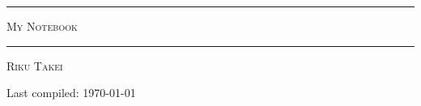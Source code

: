 \begin{titlepage}

\centering

\rule[2.0mm]{0.5\textwidth}{0.5mm}

\begin{doublespace}
    {\Huge \scshape My Notebook}
\end{doublespace}

\rule[2.0mm]{0.5\textwidth}{0.5mm}

\vfill

\vspace{2.0mm}
{\Large \scshape Riku Takei}

\vspace{10.0mm}
{\normalsize Last compiled: \today}

\end{titlepage}
